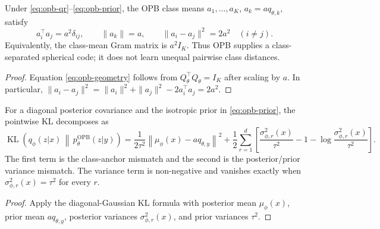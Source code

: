 \begin{proposition}
\label{prop:opb-frame}
Under \eqref{eq:opb-qr}--\eqref{eq:opb-prior}, the OPB class means
$a_1,\ldots,a_K$, $a_k=a q_{\theta,k}$, satisfy
\begin{equation}
a_i^{\top}a_j = a^2\delta_{ij},
\qquad
\|a_k\|=a,
\qquad
\|a_i-a_j\|^2=2a^2\quad(i\ne j).
\label{eq:opb-geometry}
\end{equation}
Equivalently, the class-mean Gram matrix is $a^2 I_K$. Thus OPB supplies a
class-separated spherical code; it does not learn unequal pairwise class distances.
\end{proposition}

\begin{proof}
Equation \eqref{eq:opb-geometry} follows from $Q_\theta^{\top}Q_\theta=I_K$ after
scaling by $a$. In particular,
$\|a_i-a_j\|^2=\|a_i\|^2+\|a_j\|^2-2a_i^{\top}a_j=2a^2$.
\end{proof}

\begin{lemma}
\label{lem:opb-kl-decomposition}
For a diagonal posterior covariance and the isotropic prior in \eqref{eq:opb-prior},
the pointwise KL decomposes as
\begin{equation}
\operatorname{KL}\!\left(q_\phi(z|x)\,\middle\|\,
p_{\theta}^{\mathrm{OPB}}(z|y)\right)
= \frac{1}{2\tau^2}
\left\|\mu_\phi(x)-a q_{\theta,y}\right\|^2
+ \frac12\sum_{r=1}^{d}
\left[
\frac{\sigma_{\phi,r}^2(x)}{\tau^2}-1
-\log\frac{\sigma_{\phi,r}^2(x)}{\tau^2}
\right].
\label{eq:opb-kl-decomposition}
\end{equation}
The first term is the class-anchor mismatch and the second is the posterior/prior
variance mismatch. The variance term is non-negative and vanishes exactly when
$\sigma_{\phi,r}^2(x)=\tau^2$ for every $r$.
\end{lemma}

\begin{proof}
Apply the diagonal-Gaussian KL formula with posterior mean
$\mu_\phi(x)$, prior mean $a q_{\theta,y}$, posterior variances
$\sigma_{\phi,r}^2(x)$, and prior variances $\tau^2$.
\end{proof}

